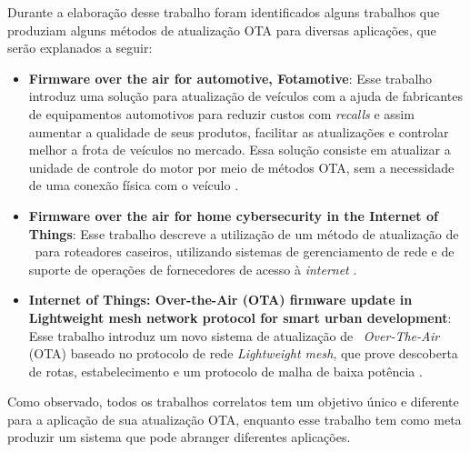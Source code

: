 Durante a elaboração desse trabalho foram identificados alguns trabalhos que produziam alguns métodos de atualização OTA para diversas aplicações, que serão explanados a seguir:


\begin{itemize}

    \item \textbf{Firmware over the air for automotive, Fotamotive}: Esse trabalho introduz uma solução para atualização de veículos com a ajuda de fabricantes de equipamentos automotivos para reduzir custos com \textit{recalls} e assim aumentar a qualidade de seus produtos, facilitar as atualizações e controlar melhor a frota de veículos no mercado. Essa solução consiste em atualizar a unidade de controle do motor por meio de métodos OTA, sem a necessidade de uma conexão física com o veículo \cite{Odat2014}.

    \item \textbf{Firmware over the air for home cybersecurity in the Internet of Things}: Esse trabalho descreve a utilização de um método de atualização de \firmware\ para roteadores caseiros, utilizando sistemas de gerenciamento de rede e de suporte de operações de fornecedores de acesso à \textit{internet} \cite{Teng2017}.
    
    \item \textbf{Internet of Things: Over-the-Air (OTA) firmware update in Lightweight mesh network protocol for smart urban development}: Esse trabalho introduz um novo sistema de atualização de \firmware\ \textit{Over-The-Air} (OTA) baseado no protocolo de rede \textit{Lightweight mesh}, que prove descoberta de rotas, estabelecimento e um protocolo de malha de baixa potência \cite{Chandra2016}.

\end{itemize}

Como observado, todos os trabalhos correlatos tem um objetivo único e diferente para a aplicação de sua atualização OTA, enquanto esse trabalho tem como meta produzir um sistema que pode abranger diferentes aplicações.